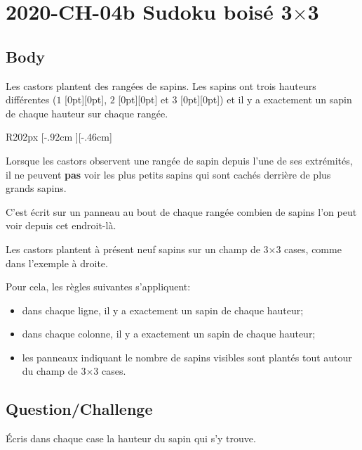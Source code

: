 \documentclass[a4paper,11pt]{report}
\newcommand{\taskGraphicsFolder}{..}
\begin{document}
\section*{\centering{} 2020-CH-04b Sudoku boisé 3\ensuremath{\times}3}


\subsection*{Body}

Les castors plantent des rangées de sapins. Les sapins ont trois hauteurs différentes ($1$ \raisebox{-0.5ex}[0pt][0pt]{}, $2$ \raisebox{-0.5ex}[0pt][0pt]{} et $3$ \raisebox{-0.5ex}[0pt][0pt]{}) et il y a exactement un sapin de chaque hauteur sur chaque rangée.

\begin{wrapfigure}{R}{202px}
\raisebox{-.46cm}[\dimexpr \height-.92cm \relax][-.46cm]{}
\end{wrapfigure}

Lorsque les castors observent une rangée de sapin depuis l’une de ses extrémités, il ne peuvent \textbf{pas} voir les plus petits sapins qui sont cachés derrière de plus grands sapins.

C’est écrit sur un panneau au bout de chaque rangée combien de sapins l’on peut voir depuis cet endroit-là.

Les castors plantent à présent neuf sapins sur un champ de 3\ensuremath{\times}$3$ cases, comme dans l’exemple à droite.

Pour cela, les règles suivantes s’appliquent:

\begin{itemize}
  \item dans chaque ligne, il y a exactement un sapin de chaque hauteur;
  \item dans chaque colonne, il y a exactement un sapin de chaque hauteur;
  \item les panneaux indiquant le nombre de sapins visibles sont plantés tout autour du champ de 3\ensuremath{\times}$3$ cases.
\end{itemize}

{\em

\subsection*{Question/Challenge}

Écris dans chaque case la hauteur du sapin qui s’y trouve.

{\centering%
\par}

}\begingroup
\renewcommand{\arraystretch}{1.5}
\end{document}
